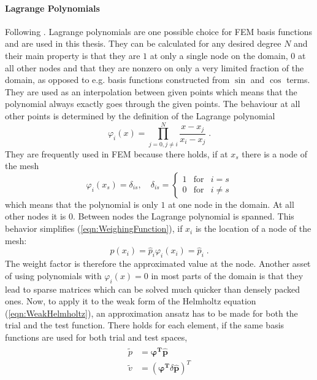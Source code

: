 \documentclass[%
  a4paper,oneside,%
  11pt,%
  smallchapters,
  green,%
  rgb, <cmyk>
  ]{tubsbook}
\begin{document}
\paragraph{Lagrange Polynomials}
Following \cite{langtangen2019}.
Lagrange polynomials are one possible choice for FEM basis functions and are used in this thesis. They can be calculated for any desired degree $N$ and their main property is that they are $1$ at only a single node on the domain, $0$ at all other nodes and that they are nonzero on only a very limited fraction of the domain, as opposed to e.g. basis functions constructed from $\sin$ and $\cos$ terms. They are used as an interpolation between given points which means that the polynomial always exactly goes through the given points. The behaviour at all other points is determined by the definition of the Lagrange polynomial
\begin{equation}
\varphi_i(x) = \prod_{j=0,j\neq i}^N \frac{x-x_j}{x_i-x_j} \;.
\end{equation}
They are frequently used in FEM because there holds, if at $x_s$ there is a node of the mesh 
\begin{equation}
\varphi_i(x_s) = \delta_{is}, \quad \delta_{is}  =     \left\{ \begin{array}{rcl} 1 & \mbox{for}& i = s  \\ 0 & \mbox{for} & i \neq s\end{array}\right .
\end{equation}
which means that the polynomial is only $1$ at one node in the domain. At all other nodes it is $0$. Between nodes the Lagrange polynomial is spanned. This behavior simplifies (\ref{eqn:WeighingFunction}), if $x_i$ is the location of a node of the mesh:
\begin{equation}
p(x_i) = \hat{p}_i \varphi_i(x_i) = \hat{p}_i \;.
\end{equation}
The weight factor is therefore the approximated value at the node.
Another asset of using polynomials with $\varphi_i(x) = 0$ in most parts of the domain is that they lead to sparse matrices which can be solved much quicker than densely packed ones.
%
Now, to apply it to the weak form of the Helmholtz equation (\ref{eqn:WeakHelmholtz}), an approximation ansatz has to be made for both the trial and the test function. There holds for each element, if the same basis functions are used for both trial and test spaces,
\begin{align}
\begin{split}
\tilde{p} &= \bm{\varphi^T} \hat{\bm{p}} \\
\tilde{v} &= (\bm{\varphi^T} \delta\hat{\bm{p}})^T
\end{split}
\label{eqn:FEMAnsatz}
\end{align}
\end{document}
